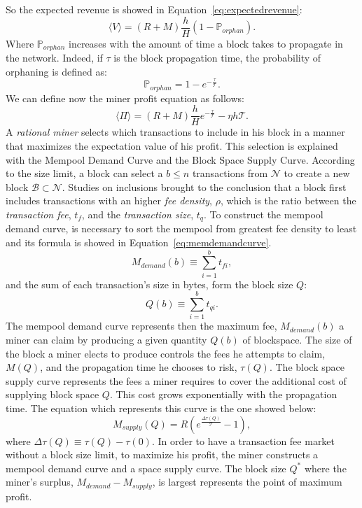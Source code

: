 \documentclass[USenglish]{uit-thesis}
\begin{document}
So the expected revenue is showed in Equation~\ref{eq:expectedrevenue}:
\begin{equation}
\label{eq:expectedrevenue}
\langle V\rangle = \left(R + M\right)\frac{h}{H}\left(1 - \mathbb{P}_{orphan}\right).
\end{equation}
Where $\mathbb{P}_{orphan}$ increases with the amount of time a block takes
to propagate in the network. Indeed, if $\tau$ is
the block propagation time, the
probability of orphaning is defined as:
\begin{equation}
\label{eq:orphaning}
\mathbb{P}_{orphan} = 1 - e^{-\frac{\tau}{\mathcal{T}}}.
\end{equation}
We can define now the miner profit equation as follows:
\begin{equation}
\label{eq:minerprofiteq}
\langle \Pi \rangle = (R + M)\frac{h}{H} e^{-\frac{\tau}{\mathcal{T}}} -\eta h\mathcal{T}.
\end{equation}
A \emph{rational miner} selects which
transactions to include in his block in a manner that maximizes
the expectation value of his profit. This
selection is explained with the Mempool Demand Curve
and the Block Space Supply Curve.
According to the size limit, a block can select a $b \leq n$
transactions from $\mathcal{N}$ to create a
new block $\mathcal{B} \subset \mathcal{N}$.
Studies on inclusions brought to the conclusion
that a block first includes transactions
with an higher \emph{fee density}, $\rho$,
which is the ratio between
the \emph{transaction fee}, $t_f$, and
the \emph{transaction size}, $t_q$.
To construct the mempool demand
curve, is necessary to sort the mempool from
greatest fee density to least and its
formula is showed in Equation~\ref{eq:memdemandcurve}.
\begin{equation}
\label{eq:memdemandcurve}
M_{demand}(b) \equiv \sum_{i=1}^{b} t_{fi},
\end{equation}
and the sum of each transaction's size in bytes, form the
block size $Q$:
\begin{equation}
\label{eq:transactionsize}
Q(b) \equiv \sum_{i = 1}^{b} t_{qi}.
\end{equation}
The mempool demand curve represents then
the maximum fee, $M_{demand}(b)$
a miner can claim by producing
a given quantity $Q(b)$ of blockspace.
The size of the block a miner elects to
produce controls the fees he attempts to claim, $M(Q)$,
and the propagation time he chooses to risk, $\tau(Q)$.
The block space supply curve represents
the fees a miner requires to cover the additional cost of
supplying block space $Q$. This cost grows
exponentially with the propagation time. The equation which
represents this curve is the one showed below:
\begin{equation}
\label{eq:blockspacesupply}
M_{supply}(Q) = R\left(e^{\frac{\Delta \tau (Q)}{\mathcal{T}}} - 1\right),
\end{equation}
where $\Delta \tau (Q) \equiv \tau(Q) - \tau(0)$.
In order to have a transaction fee market
without a block size limit, to maximize his profit,
the miner constructs a mempool
demand curve and a space supply curve.
The block size $Q^*$ where the miner's surplus,
$M_{demand} - M_{supply}$, is largest represents
the point of maximum profit.
\end{document}
